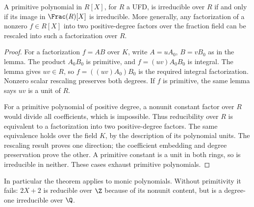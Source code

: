 \begin{theorem}\label{thm:gauss-fraction}
A primitive polynomial in $R[X]$, for $R$ a UFD, is irreducible
over $R$ if and only if its image in $\Frac(R)[X]$ is irreducible.
More generally, any factorization of a nonzero $f\in R[X]$ into two
positive-degree factors over the fraction field can be rescaled into
such a factorization over $R$.
\end{theorem}
\begin{proof}
For a factorization $f=AB$ over $K$, write $A=uA_0$, $B=vB_0$
as in the lemma. The product $A_0B_0$ is primitive, and
$f=(uv)A_0B_0$ is integral. The lemma gives $uv\in R$, so
$f=((uv)A_0)B_0$ is the required integral factorization.
Nonzero scalar rescaling preserves both degrees.
If $f$ is primitive, the same lemma says $uv$ is a unit of $R$.

For a primitive polynomial of positive degree, a nonunit constant
factor over $R$ would divide all coefficients, which is impossible.
Thus reducibility over $R$ is equivalent to a factorization into
two positive-degree factors. The same equivalence holds over the
field $K$, by the description of its polynomial units.
The rescaling result proves one direction; the coefficient embedding
and degree preservation prove the other. A primitive constant is
a unit in both rings, so is irreducible in neither. These cases
exhaust primitive polynomials.
\end{proof}
In particular the theorem applies to monic polynomials. Without
primitivity it fails: $2X+2$ is reducible over $\Z$ because of its
nonunit content, but is a degree-one irreducible over $\Q$.

